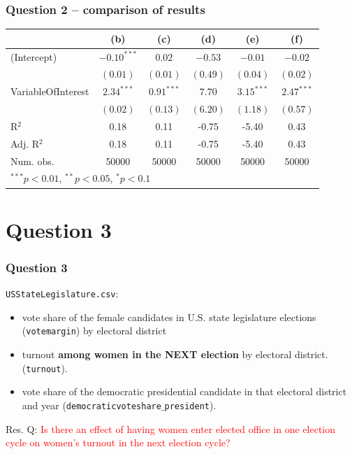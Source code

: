 \documentclass[xcolor=table,dvipsnames]{beamer}
\begin{document}
\begin{frame}
\frametitle{Question 2 -- comparison of results}
\begin{table}
\begin{center}
\begin{tabular}{l c c c c c }
\hline
 & (b) 			& (c) 		& (d) & (e) & (f) \\
\hline
(Intercept)        & $-0.10^{***}$ & $0.02$       & $-0.53$  & $-0.01$      & $-0.02$      \\
                   & $(0.01)$      & $(0.01)$     & $(0.49)$ & $(0.04)$     & $(0.02)$     \\
VariableOfInterest & $2.34^{***}$  & $0.91^{***}$ & $7.70$   & $3.15^{***}$ & $2.47^{***}$ \\
                   & $(0.02)$      & $(0.13)$     & $(6.20)$ & $(1.18)$     & $(0.57)$     \\
\hline
R$^2$              & 0.18          & 0.11         & -0.75    & -5.40        & 0.43         \\
Adj. R$^2$         & 0.18          & 0.11         & -0.75    & -5.40        & 0.43         \\
Num. obs.          & 50000         & 50000        & 50000    & 50000        & 50000        \\
\hline
\multicolumn{6}{l}{\scriptsize{$^{***}p<0.01$, $^{**}p<0.05$, $^*p<0.1$}}
\end{tabular}
\end{center}
\end{table}
\end{frame}

\section{Question 3}

\begin{frame}
\frametitle{Question 3}
\texttt{USStateLegislature.csv}: 
\begin{itemize}
\item vote share of the female candidates in U.S. state legislature elections (\texttt{votemargin}) by electoral district \pause 
\item turnout \textbf{among women in the NEXT election} by electoral district. (\texttt{turnout}). \pause
\item vote share of the democratic presidential candidate in that electoral district and year (\texttt{democraticvoteshare$\_$president}). \pause
\end{itemize}

Res. Q: \textcolor{red}{Is there an effect of having women enter elected office in one election cycle on women's turnout in the next election cycle?} 
\end{frame}
\end{document}
